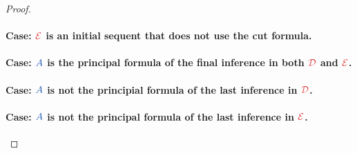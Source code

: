 \begin{proof}
  \paragraph{Case: $\prf{E}$ is an initial sequent that does not use the cut
  formula.}\quad{}

  \paragraph{Case: $\prp{A}$ is the principal formula of the final inference
  in both $\prf{D}$ and $\prf{E}$.}\quad

  \paragraph{Case: $\prp{A}$ is not the principial formula of the last
  inference in $\prf{D}$.}\quad

  \paragraph{Case: $\prp{A}$ is not the principal formula of the last
  inference in $\prf{E}$.}\quad

\end{proof}




